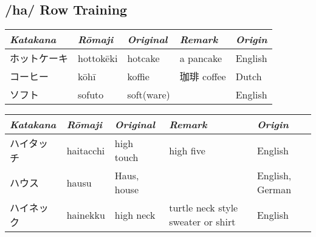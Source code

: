\subsection{/ha/ Row Training}\label{sec:HaRowTraining}
\Padding
\begin{longtable}[c]{p{3cm}p{2cm}p{3cm}p{5cm}p{2cm}}
\textit{Katakana}&\textit{Rōmaji}&\textit{Original}&\textit{Remark}&\textit{Origin}\\\hline
ホットケーキ&hottokēki&hotcake    &a pancake                         &English\\
コーヒー    &kōhī     &koffie     &珈琲  coffee                      &Dutch\\
ソフト      &sofuto   &soft(ware) &                                  &English \\
\end{longtable}



\newpage
\Padding
\begin{longtable}[c]{p{2cm}p{2cm}p{3cm}p{6cm}p{2cm}}
\textit{Katakana}&\textit{Rōmaji}&\textit{Original}&\textit{Remark}&\textit{Origin}\\\hline
ハイタッチ  &haitacchi&high touch &high five                         &English\\
ハウス      &hausu    &Haus, house&                                  &English, German\\
ハイネック  &hainekku &high neck  &turtle neck style sweater or shirt&English\\
\end{longtable}


\newpage
